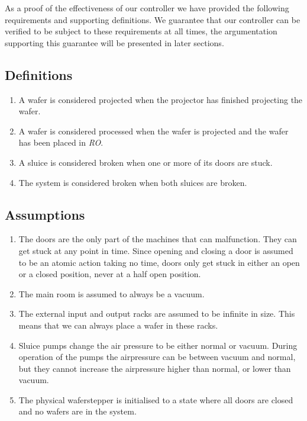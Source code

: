 
As a proof of the effectiveness of our controller we have provided the following requirements and supporting definitions. We guarantee that our controller can be verified to be subject to these requirements at all times, the argumentation supporting this guarantee will be presented in later sections.

\subsection{Definitions}
\begin{enumerate}
  \item A wafer is considered projected when the projector has finished projecting the wafer.
  \item A wafer is considered processed when the wafer is projected and the wafer has been placed in \textit{RO}.
  \item A sluice is considered broken when one or more of its doors are stuck.
  \item The system is considered broken when both sluices are broken.
\end{enumerate}

\subsection{Assumptions}
\begin{enumerate}
  \item The doors are the only part of the machines that can malfunction. They can get stuck at any point in time. Since opening and closing a door is assumed to be an atomic action taking no time, doors only get stuck in either an open or a closed position, never at a half open position.
  \item The main room is assumed to always be a vacuum.
  \item The external input and output racks are assumed to be infinite in size. This means that we can always place a wafer in these racks.
  \item Sluice pumps change the air pressure to be either normal or vacuum. During operation of the pumps the airpressure can be between vacuum and normal, but they cannot increase the airpressure higher than normal, or lower than vacuum.
  \item The physical waferstepper is initialised to a state where all doors are closed and no wafers are in the system.
\end{enumerate}

